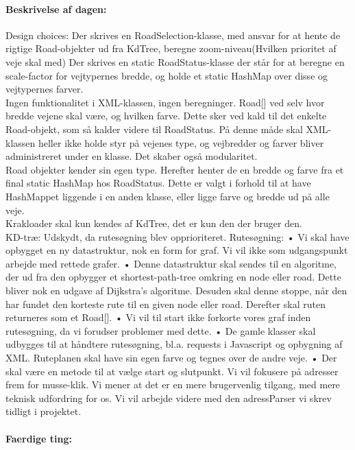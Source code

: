 \documentclass[a4paper,10pt,titlepage]{article}
\begin{document}
		\paragraph{Beskrivelse af dagen:}
		Design choices:
	Der skrives en RoadSelection-klasse, med ansvar for at hente de rigtige Road-objekter ud fra KdTree, beregne zoom-niveau(Hvilken prioritet af veje skal med)
Der skrives en static RoadStatus-klasse der står for at beregne en scale-factor for vejtypernes bredde, og holde et static HashMap over disse og vejtypernes farver.\\
Ingen funktionalitet i XML-klassen, ingen beregninger. Road[] ved selv hvor bredde vejene skal være, og hvilken farve. Dette sker ved kald til det enkelte Road-objekt, som så kalder videre til RoadStatus. På denne måde skal XML-klassen heller ikke holde styr på vejenes type, og vejbredder og farver bliver administreret under en klasse. Det skaber også modularitet.\\
Road objekter kender sin egen type. Herefter henter de en bredde og farve fra et final static HashMap hos RoadStatus. Dette er valgt i forhold til at have HashMappet liggende i en anden klasse, eller ligge farve og bredde ud på alle veje.\\
Krakloader skal kun kendes af KdTree, det er kun den der bruger den.\\
KD-træ:
Udskydt, da rutesøgning blev opprioriteret.
Rutesøgning:
•	Vi skal have opbygget en ny datastruktur, nok en form for graf. Vi vil ikke som udgangspunkt arbejde med rettede grafer.
•	Denne datastruktur skal sendes til en algoritme, der ud fra den opbygger et shortest-path-tree omkring en node eller road. Dette bliver nok en udgave af Dijkstra’s algoritme. Desuden skal denne stoppe, når den har fundet den korteste rute til en given node eller road. Derefter skal ruten returneres som et Road[].
•	Vi vil til start ikke forkorte vores graf inden rutesøgning, da vi forudser problemer med dette.
•	De gamle klasser skal udbygges til at håndtere rutesøgning, bl.a. requests i Javascript og opbygning af XML. Ruteplanen skal have sin egen farve og tegnes over de andre veje.
•	Der skal være en metode til at vælge start og slutpunkt. Vi vil fokusere på adresser frem for musse-klik. Vi mener at det er en mere brugervenlig tilgang, med mere teknisk udfordring for os. Vi vil arbejde videre med den adressParser vi skrev tidligt i projektet.

		\paragraph{Faerdige ting:}
		
\end{document}
